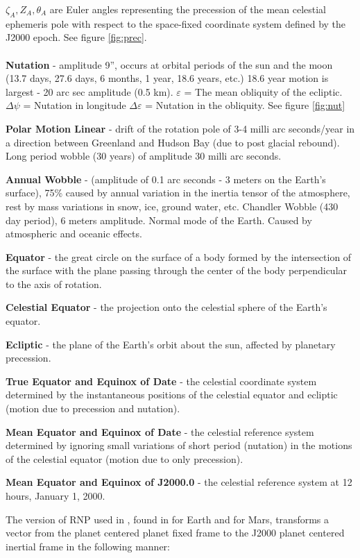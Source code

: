 $\zeta _A ,Z_A ,\theta _A $ are Euler angles representing the
precession of the mean celestial ephemeris pole with respect to
the space-fixed coordinate system defined by the J2000 epoch. 
See figure \ref{fig:prec}. \\ \\
\textbf{Nutation} - amplitude 9'', occurs at orbital periods of 
the sun and the moon (13.7 days, 27.6 days, 6 months, 
1 year, 18.6 years, etc.) 18.6 year motion is largest - 20 
arc sec amplitude (0.5 km).
$\varepsilon$ = The mean obliquity of the ecliptic.
$\Delta \psi$ = Nutation in longitude
$\Delta \varepsilon$ = Nutation in the obliquity.
See figure \ref{fig:nut}

\textbf{Polar Motion Linear} - drift of the rotation pole of 3-4 milli arc 
seconds/year in a direction between Greenland and Hudson Bay (due to 
post glacial rebound).  Long period wobble (30 years) of amplitude 
30 milli arc seconds.

\textbf{Annual Wobble} - (amplitude of 0.1 arc seconds - 3 
meters on the Earth's surface), 75{\%} caused by annual 
variation in the inertia tensor of the atmosphere, rest 
by mass variations in snow, ice, ground water, etc. 
Chandler Wobble (430 day period), 6 meters amplitude.  
Normal mode of the Earth. Caused by atmospheric and oceanic effects.

\textbf{Equator} - the great circle on the surface of a body formed by the 
intersection of the surface with the plane passing through the center of the 
body perpendicular to the axis of rotation.

\textbf{Celestial Equator} - the projection onto the celestial sphere 
of the Earth's equator.

\textbf{Ecliptic} - the plane of the Earth's orbit about the sun, 
affected by planetary precession.

\textbf{True Equator and Equinox of Date} - the celestial coordinate system 
determined by the instantaneous positions of the celestial equator and 
ecliptic (motion due to precession and nutation).

\textbf{Mean Equator and Equinox of Date} - the celestial reference system 
determined by ignoring small variations of short period (nutation) in the 
motions of the celestial equator (motion due to only precession).

\textbf{Mean Equator and Equinox of J2000.0} - the celestial reference system 
at 12 hours, January 1, 2000.\newline

The version of RNP used
in \JEODid, found in \cite{ValladoThird} for Earth and \cite{Konopliv06} for
Mars, transforms a vector from the planet centered planet fixed frame to the
J2000 planet centered inertial frame in the following manner:


